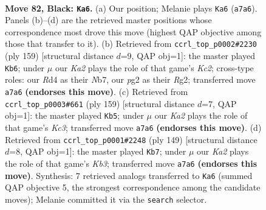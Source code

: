\documentclass[11pt]{article}
\begin{document}
\clearpage

\begin{figure}[p]\centering
\begin{subfigure}{0.46\textwidth}\centering
\resizebox{\linewidth}{!}{%
\newchessgame
\chessboard[
  setfen={8/k7/8/5K2/3r4/1R6/1N4P1/8 b - - 29 82},
  showmover=false,
  pgfstyle=straightmove, color=movearrow, markmove={a7-a6}
]}
\caption{}
\end{subfigure}\hfill
\begin{subfigure}{0.46\textwidth}\centering
\resizebox{\linewidth}{!}{%
\newchessgame
\chessboard[
  setfen={8/1nk5/8/8/K7/8/6r1/1N1R4 b - - 14 80},
  showmover=false,
  pgfstyle=straightmove, color=movearrow, markmove={c7-b6}
]}
\caption{}
\end{subfigure}
\\[4pt]
\begin{subfigure}{0.46\textwidth}\centering
\resizebox{\linewidth}{!}{%
\newchessgame
\chessboard[
  setfen={8/R7/2k5/7p/N7/4K3/7r/8 b - - 2 80},
  showmover=false,
  pgfstyle=straightmove, color=movearrow, markmove={c6-b5}
]}
\caption{}
\end{subfigure}\hfill
\begin{subfigure}{0.46\textwidth}\centering
\resizebox{\linewidth}{!}{%
\newchessgame
\chessboard[
  setfen={8/8/1k2K3/5N2/1p6/7r/5R2/8 b - - 8 75},
  showmover=false,
  pgfstyle=straightmove, color=movearrow, markmove={b6-b7}
]}
\caption{}
\end{subfigure}
\caption{\textbf{Move 82, Black: \texttt{Ka6}.} (a) Our position; Melanie plays \texttt{Ka6} (\texttt{a7a6}). Panels (b)--(d) are the retrieved master positions whose correspondence most drove this move (highest QAP objective among those that transfer to it). (b) Retrieved from \texttt{ccrl\_top\_p0002\#2230} (ply 159) [structural distance $d$=9, QAP obj=1]: the master played \texttt{Kb6}; under $\mu$ our \emph{Ka2} plays the role of that game's \emph{Kc2}; cross-type roles: our \emph{R}d4 as their \emph{N}b7, our \emph{p}g2 as their \emph{R}g2; transferred move \texttt{a7a6} \textbf{(endorses this move)}. (c) Retrieved from \texttt{ccrl\_top\_p0003\#661} (ply 159) [structural distance $d$=7, QAP obj=1]: the master played \texttt{Kb5}; under $\mu$ our \emph{Ka2} plays the role of that game's \emph{Kc3}; transferred move \texttt{a7a6} \textbf{(endorses this move)}. (d) Retrieved from \texttt{ccrl\_top\_p0001\#2248} (ply 149) [structural distance $d$=8, QAP obj=1]: the master played \texttt{Kb7}; under $\mu$ our \emph{Ka2} plays the role of that game's \emph{Kb3}; transferred move \texttt{a7a6} \textbf{(endorses this move)}. Synthesis: 7 retrieved analogs transferred to \texttt{Ka6} (summed QAP objective 5, the strongest correspondence among the candidate moves); Melanie committed it via the \texttt{search} selector.}
\label{fig:thought-m163}
\end{figure}
\end{document}
